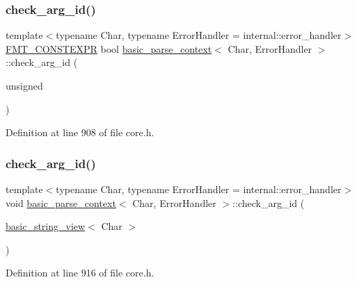 \subsubsection{\texorpdfstring{check\+\_\+arg\+\_\+id()}{check\_arg\_id()}\hspace{0.1cm}{\footnotesize\ttfamily [1/2]}}
{\footnotesize\ttfamily template$<$typename Char, typename Error\+Handler = internal\+::error\+\_\+handler$>$ \\
\hyperlink{core_8h_a69201cb276383873487bf68b4ef8b4cd}{F\+M\+T\+\_\+\+C\+O\+N\+S\+T\+E\+X\+PR} bool \hyperlink{classbasic__parse__context}{basic\+\_\+parse\+\_\+context}$<$ Char, Error\+Handler $>$\+::check\+\_\+arg\+\_\+id (\begin{DoxyParamCaption}\item[{unsigned}]{ }\end{DoxyParamCaption})\hspace{0.3cm}{\ttfamily [inline]}}



Definition at line 908 of file core.\+h.

\mbox{\label{classbasic__parse__context_af01556b56c7dd8e4c1c0692687125b96}} 
\subsubsection{\texorpdfstring{check\+\_\+arg\+\_\+id()}{check\_arg\_id()}\hspace{0.1cm}{\footnotesize\ttfamily [2/2]}}
{\footnotesize\ttfamily template$<$typename Char, typename Error\+Handler = internal\+::error\+\_\+handler$>$ \\
void \hyperlink{classbasic__parse__context}{basic\+\_\+parse\+\_\+context}$<$ Char, Error\+Handler $>$\+::check\+\_\+arg\+\_\+id (\begin{DoxyParamCaption}\item[{\hyperlink{classbasic__string__view}{basic\+\_\+string\+\_\+view}$<$ Char $>$}]{ }\end{DoxyParamCaption})\hspace{0.3cm}{\ttfamily [inline]}}



Definition at line 916 of file core.\+h.

